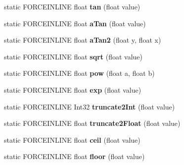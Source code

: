 \begin{DoxyCompactItemize}
static F\+O\+R\+C\+E\+I\+N\+L\+I\+NE float {\bfseries tan} (float value)
\item 
\mbox{\label{structdrider_s_d_k_1_1_math_af153bf6d9bb0a5c2a420ff9f0ee5be41}} 
static F\+O\+R\+C\+E\+I\+N\+L\+I\+NE float {\bfseries a\+Tan} (float value)
\item 
\mbox{\label{structdrider_s_d_k_1_1_math_a55047009ab261a97c1ee44e0bd67eebf}} 
static F\+O\+R\+C\+E\+I\+N\+L\+I\+NE float {\bfseries a\+Tan2} (float y, float x)
\item 
\mbox{\label{structdrider_s_d_k_1_1_math_a5afb8c4b9c5cd06febcb714a624df1e6}} 
static F\+O\+R\+C\+E\+I\+N\+L\+I\+NE float {\bfseries sqrt} (float value)
\item 
\mbox{\label{structdrider_s_d_k_1_1_math_a6bd0e5f6a734f6a86e3cdf1d3b69ff76}} 
static F\+O\+R\+C\+E\+I\+N\+L\+I\+NE float {\bfseries pow} (float a, float b)
\item 
\mbox{\label{structdrider_s_d_k_1_1_math_a6da74fa9be9674ce380b3b1a5375d281}} 
static F\+O\+R\+C\+E\+I\+N\+L\+I\+NE float {\bfseries exp} (float value)
\item 
\mbox{\label{structdrider_s_d_k_1_1_math_ac0693a87badc94fb49da7cc7ad0d8ff9}} 
static F\+O\+R\+C\+E\+I\+N\+L\+I\+NE Int32 {\bfseries truncate2\+Int} (float value)
\item 
\mbox{\label{structdrider_s_d_k_1_1_math_a28b9d2c0bff027f5748e2fc52c0db60a}} 
static F\+O\+R\+C\+E\+I\+N\+L\+I\+NE float {\bfseries truncate2\+Float} (float value)
\item 
\mbox{\label{structdrider_s_d_k_1_1_math_ab2205c073dc81daedb46147a3534860e}} 
static F\+O\+R\+C\+E\+I\+N\+L\+I\+NE float {\bfseries ceil} (float value)
\item 
\mbox{\label{structdrider_s_d_k_1_1_math_a14e73719d2870c36b2f8db5342812be1}} 
static F\+O\+R\+C\+E\+I\+N\+L\+I\+NE float {\bfseries floor} (float value)
\item 

\end{DoxyCompactItemize}
